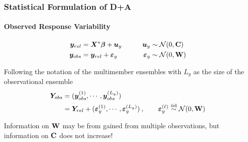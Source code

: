 \documentclass{beamer}
\newcommand{\C}{\ensuremath{\text{Cov}}}
\newcommand{\iid}{\ensuremath{\stackrel{\text{iid}}{\sim}}}
\def\*#1{\bm{#1}}
\def\C{\textbf{\text{C}}}
\def\W{\textbf{\text{W}}}
\begin{document}
\begin{frame}
\frametitle{Statistical Formulation of D+A}
\framesubtitle{Observed Response Variability}

\begin{exampleblock}{}
\vspace*{-\baselineskip}\setlength\belowdisplayshortskip{0pt}
\begin{alignat*}{3}
\*y_{rel} &= \*X^* \*\beta + \*u_y \nonumber  \qquad  &\*u_y &\sim \mathcal N(0,\C) \\
\*y_{obs} &= \*y_{rel} + \*\varepsilon_y &\*\varepsilon_y &\sim \mathcal N(0,\W)
\end{alignat*}
\end{exampleblock}

 Following the notation of the multimember ensembles with $L_y$ as the size of the observational ensemble
\begin{align*}
\*Y_{obs} &= ( \*y_{obs}^{(1)}, \cdots,  \*y_{obs}^{(L_y)}) \\
 &=  \*Y_{rel} + (  \*\varepsilon_y^{(1)}, \cdots,   \*\varepsilon_y^{(L_y)}) \: , \qquad \*\varepsilon_y^{(\ell)} \iid \mathcal N(0,\W) \\
\end{align*}

\alert{Information on $\W$ may be from gained from multiple observations, but information on $\C$ does not increase!}

\end{frame}
\end{document}
